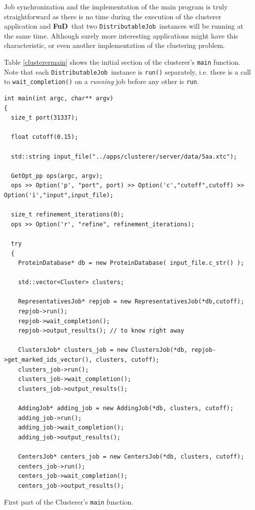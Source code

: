 \documentclass[a4paper,12pt,english]{report}
\newcommand{\fud}{\textbf{FuD}}
\renewcommand{\DJ}{\texttt{DistributableJob}}
\begin{document}
Job synchronization and the implementation of the main program is truly straightforward as there is no time during the execution of the clusterer application and \fud \ that two \DJ \ instances will be running at the same time. Although surely more interesting applications might have this characteristic, or even another implementation of the clustering problem.

Table \ref{clusterermain} shows the initial section of the clusterer's \texttt{main} function. Note that each \DJ \ instance is \texttt{run()} separately, i.e. there is a call to \texttt{wait\_completion()} on a \emph{running} job before any other is \texttt{run}.

\begin{table}[!htb]
\lstset{language=C++}
\begin{lstlisting}[frame=single]
int main(int argc, char** argv)
{
  size_t port(31337);

  float cutoff(0.15);

  std::string input_file("../apps/clusterer/server/data/5aa.xtc");

  GetOpt_pp ops(argc, argv);
  ops >> Option('p', "port", port) >> Option('c',"cutoff",cutoff) >> Option('i',"input",input_file);

  size_t refinement_iterations(0);
  ops >> Option('r', "refine", refinement_iterations);

  try
  {
    ProteinDatabase* db = new ProteinDatabase( input_file.c_str() );

    std::vector<Cluster> clusters;

    RepresentativesJob* repjob = new RepresentativesJob(*db,cutoff);
    repjob->run();
    repjob->wait_completion();
    repjob->output_results(); // to know right away

    ClustersJob* clusters_job = new ClustersJob(*db, repjob->get_marked_ids_vector(), clusters, cutoff);
    clusters_job->run();
    clusters_job->wait_completion();
    clusters_job->output_results();

    AddingJob* adding_job = new AddingJob(*db, clusters, cutoff);
    adding_job->run();
    adding_job->wait_completion();
    adding_job->output_results();

    CentersJob* centers_job = new CentersJob(*db, clusters, cutoff);
    centers_job->run();
    centers_job->wait_completion();
    centers_job->output_results();
\end{lstlisting}
\centering \caption{First part of the Clusterer's \texttt{main} function.} 
\label{clusterermain}
\end{table}
\end{document}
